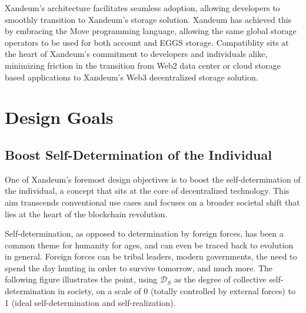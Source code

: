 \documentclass[11pt]{article}   	%
\let\oldsection\section
\renewcommand{\section}{\clearpage\oldsection}
\begin{document}
Xandeum's architecture facilitates seamless adoption, allowing developers to smoothly transition to Xandeum's storage solution. Xandeum has achieved this by embracing the Move programming language, allowing the same global storage operators to be used for both account and EGGS storage. Compatiblity sits at the heart of Xandeum's commitment to developers and individuals alike, minimizing friction in the transition from Web2 data center or cloud storage based applications to Xandeum's Web3 decentralized storage solution.

\clearpage
\tableofcontents
\clearpage

\section{Design Goals}
\subsection{Boost Self-Determination of the Individual}
One of Xandeum's foremost design objectives is to boost the self-determination of the individual, a concept that sits at the core of decentralized technology. This aim transcends conventional use cases and focuses on a broader societal shift that lies at the heart of the blockchain revolution.

Self-determination, as opposed to determination by foreign forces, has been a common theme for humanity for ages, and can even be traced back to evolution in general. Foreign forces can be tribal leaders, modern governments, the need to spend the day hunting in order to survive tomorrow, and much more. The following figure illustrates the point, using $\mathcal{D}_{S}$ as the degree of collective self-determination in society, on a scale of 0 (totally controlled by external forces) to 1 (ideal self-determination and self-realization).

\ \\
\end{document}
